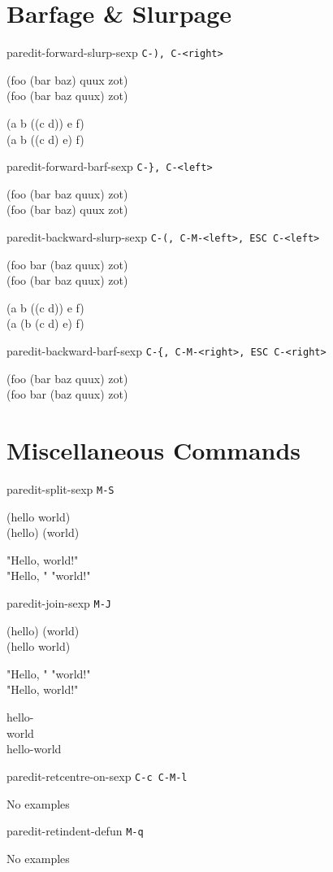 \documentclass[8pt,landscape,a4paper]{article}
\begin{document}
\begin{multicols}{4}
    \section*{Barfage \& Slurpage}

paredit-forward-slurp-sexp \texttt{C-), C-<right>}

{\ttfamily
(foo (bar \cursor baz) quux zot)\\
(foo (bar \cursor baz quux) zot)

(a b ((c\cursor{} d)) e f)\\
(a b ((c\cursor{} d) e) f)
}

paredit-forward-barf-sexp \texttt{C-\}, C-<left>}

{\ttfamily
(foo (bar \cursor baz quux) zot)\\
(foo (bar \cursor baz) quux zot)
}

paredit-backward-slurp-sexp \texttt{C-(, C-M-<left>, ESC C-<left>}

{\ttfamily
(foo bar (baz\cursor{} quux) zot)\\
(foo (bar\cursor{} baz quux) zot)

(a b ((c\cursor{} d)) e f)\\
(a (b (c\cursor{} d) e) f)
}

paredit-backward-barf-sexp \texttt{C-\{, C-M-<right>, ESC C-<right>}

{\ttfamily
(foo (bar baz \cursor quux) zot)\\
(foo bar (baz \cursor quux) zot)
}

    \section*{Miscellaneous Commands}

paredit-split-sexp \texttt{M-S}

{\ttfamily
(hello\cursor{} world)\\
(hello)\cursor{} (world)

"Hello, \cursor world!"\\
"Hello, "\cursor{} "world!"
}

paredit-join-sexp \texttt{M-J}

{\ttfamily
(hello)\cursor{} (world)\\
(hello\cursor{} world)

"Hello, "\cursor{} "world!"\\
"Hello, \cursor world!"

hello-\\
\cursor \space \space world\\
hello-\cursor world
}

paredit-retcentre-on-sexp \texttt{C-c C-M-l}

{\ttfamily
No examples
}

paredit-retindent-defun \texttt{M-q}

{\ttfamily
No examples
}

  \end{multicols}
\end{document}
